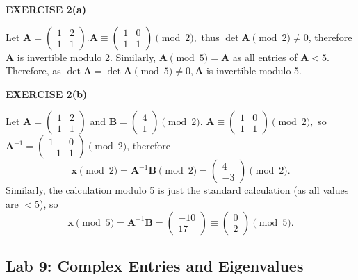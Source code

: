 \documentclass[12pt]{article}
\newcommand{\mat}[1]{\mathbf{#1}}
\newcommand{\exercise}[1]{\textbf{EXERCISE #1}\label{#1}}
\begin{document}
\exercise{2(a)}

Let $\mat{A} = \begin{pmatrix} 1 & 2 \\ 1 & 1 \end{pmatrix}. \mat{A} \equiv \begin{pmatrix} 1 & 0 \\ 1 & 1 \end{pmatrix} \pmod{2},$ thus $\det \mat{A} \pmod{2} \neq 0$, therefore $\mat{A}$ is invertible modulo 2. Similarly, $\mat{A} \pmod{5} = \mat{A}$ as all entries of $\mat{A} < 5$. Therefore, as $\det \mat{A} = \det \mat{A} \pmod{5} \ne 0, \mat{A}$ is invertible modulo 5.

\exercise{2(b)}

Let $\mat{A} = \begin{pmatrix} 1 & 2 \\ 1 & 1 \end{pmatrix}$ and $\mat{B} = \begin{pmatrix} 4 \\ 1 \end{pmatrix} \pmod{2}.$ $\mat{A} \equiv \begin{pmatrix} 1 & 0 \\ 1 & 1 \end{pmatrix} \pmod{2},$ so $\mat{A}^{-1} = \begin{pmatrix} 1 & 0 \\ -1 & 1 \end{pmatrix} \pmod{2}$, therefore
\begin{equation*}
\mat{x}\pmod{2} = \mat{A}^{-1} \mat{B}\pmod{2} = \begin{pmatrix} 4 \\ -3 \end{pmatrix} \pmod{2}.
\end{equation*}
Similarly, the calculation modulo 5 is just the standard calculation (as all values are $< 5$), so
\begin{equation*}
\mat{x}\pmod{5} = \mat{A}^{-1} \mat{B} = \begin{pmatrix} -10 \\ 17 \end{pmatrix} \equiv \begin{pmatrix} 0 \\ 2 \end{pmatrix} \pmod{5}.
\end{equation*}

\subsection{Lab 9: Complex Entries and Eigenvalues}
\end{document}
